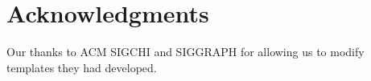 \documentclass[twoside,twocolumn,10pt]{article}
\begin{document}
\section{Acknowledgments}
Our thanks to ACM SIGCHI and SIGGRAPH for allowing us to modify templates they had developed.

%
%


\end{document}
